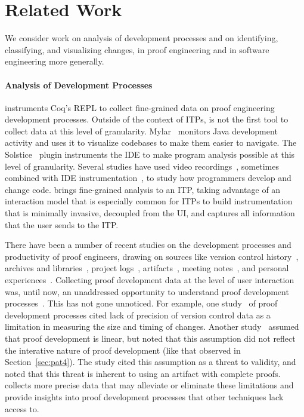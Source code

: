 \section{Related Work}

We consider work on analysis of development processes
and on identifying, classifying, and visualizing changes, in
proof engineering and in software engineering more generally.

\paragraph{Analysis of Development Processes}

\toolname instruments Coq's REPL to collect fine-grained data on
proof engineering development processes.
Outside of the context of ITPs, \toolname is not the first
tool to collect data at this level of granularity.
Mylar~\cite{mylar} monitors Java development activity 
and uses it to visualize codebases to make them easier
to navigate.
The Solstice~\cite{MusluBEN2015} plugin instruments the IDE to
make program analysis possible at this level of granularity.
Several studies have used video 
recordings~\cite{Robillard2004, ko-explore}, sometimes combined with 
IDE instrumentation~\cite{comprehension},
to study how programmers develop and change code.
\toolname brings fine-grained analysis to an ITP,
taking advantage of an interaction model that is especially common for ITPs
to build instrumentation that is minimally invasive, decoupled from the UI, 
and captures all information that the user sends to the ITP.

There have been a number of recent studies on the development 
processes and productivity of proof engineers, drawing on sources like
version control history~\cite{Andronick2012, Zhang2012, Staples2014},
archives and libraries~\cite{Blanchette2015, Matichuk2015, Wiedijk2009,
Aspinall2016},
project logs~\cite{Andronick2012, Zhang2012}, 
artifacts~\cite{Staples2013, Matichuk2015, Aspinall2016},
meeting notes~\cite{Andronick2012, Zhang2012},
and personal experiences~\cite{Bourke12, Woos2016}.
Collecting proof development data 
at the level of user interaction was, until now, 
an unaddressed opportunity to understand 
proof development processes~\cite{PGL-045}.
This has not gone unnoticed.
For example, one study~\cite{Zhang2012} of proof development processes cited 
lack of precision of version control data as a limitation in measuring 
the size and timing of changes.
Another study~\cite{Matichuk2015} assumed that proof development is linear,
but noted that this assumption did not reflect the interative
nature of proof development (like that observed in Section~\ref{sec:pat4}).
The study cited this assumption as a threat to validity, and noted
that this threat is inherent to using an artifact with complete 
proofs.
\toolname collects more precise data that may alleviate or eliminate
these limitations and provide insights into proof development processes 
that other  techniques lack access to.

